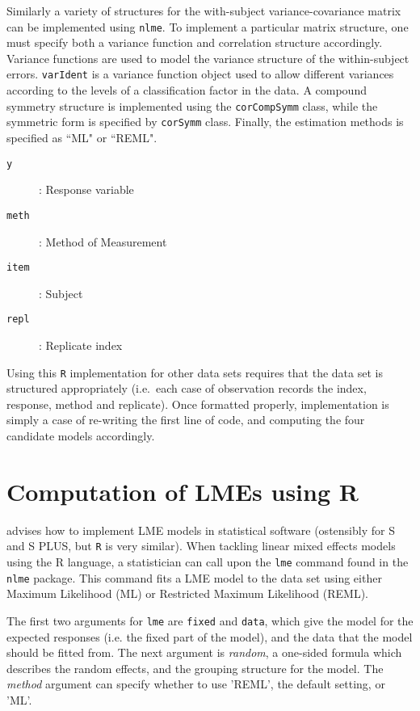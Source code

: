 \documentclass[12pt, a4paper]{report}
\theoremstyle{plain}
\theoremstyle{definition}
\theoremstyle{remark}
\begin{document}
Similarly a variety of structures for the with-subject variance-covariance matrix can be implemented using \texttt{nlme}. To implement a particular matrix structure, one must specify both a variance function and correlation structure accordingly. Variance functions are used to model the variance structure of the within-subject errors. \texttt{varIdent} is a variance function object used to allow different variances according to the levels of a classification factor in the data. A compound symmetry structure is implemented using the \texttt{corCompSymm} class, while the symmetric form is specified by \texttt{corSymm} class. Finally, the estimation methods is specified as ``ML" or ``REML".

\begin{framed}
\begin{description}
\item[\texttt{y}] : Response variable
\item[\texttt{meth}] : Method of Measurement
\item[\texttt{item}] : Subject
\item[\texttt{repl}] : Replicate index
\end{description}
\end{framed}

Using this \texttt{R} implementation for other data sets requires that the data set is structured appropriately (i.e.\ each case of observation records the index, response, method and replicate). Once formatted properly, implementation is simply a case of re-writing the first line of code, and computing the four candidate models accordingly.



\section{Computation of LMEs using R} 

\cite{PB} advises how to
implement LME models in statistical software (ostensibly for S and S PLUS, but \texttt{R} is very similar). When tackling linear mixed effects models using the R language, a statistician can call upon the \texttt{lme} command found in the \texttt{nlme} package. This command fits a LME model to the data set using either Maximum Likelihood (ML) or Restricted Maximum Likelihood (REML). 

The first two arguments for \texttt{lme} are \texttt{fixed} and \texttt{data}, which give the model for the expected responses (i.e. the fixed part of the model), and the data that the model should be fitted from. The next argument is  \emph{random}, a one-sided
formula which describes the random effects, and the grouping structure for the model. The  \emph{method} argument can specify whether to use 'REML', the default setting, or 'ML'.
\end{document}

